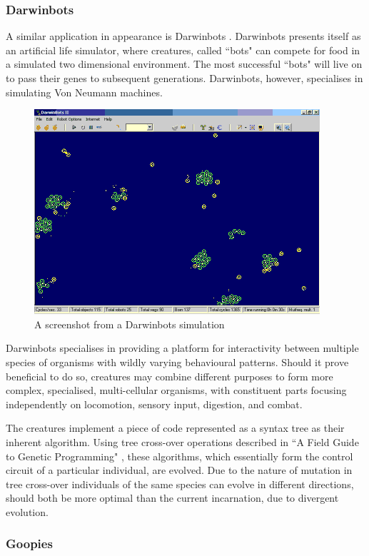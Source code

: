 \subsubsection{Darwinbots}

A similar application in appearance is Darwinbots \cite{darwinbots}. Darwinbots presents itself as an artificial life simulator, where creatures, called ``bots" can compete for food in a simulated two dimensional environment. The most successful ``bots" will live on to pass their genes to subsequent generations. Darwinbots, however, specialises in simulating Von Neumann machines.
\begin{figure}[!th]
	\centering
	\includegraphics[scale=1]{images/darwinbots}
	\caption{A screenshot from a Darwinbots simulation}
\end{figure}

Darwinbots specialises in providing a platform for interactivity between multiple species of organisms with wildly varying behavioural patterns. Should it prove beneficial to do so, creatures may combine different purposes to form more complex, specialised, multi-cellular organisms, with constituent parts focusing independently on locomotion, sensory input, digestion, and combat.

The creatures implement a piece of code represented as a syntax tree as their inherent algorithm. Using tree cross-over operations described in ``A Field Guide to Genetic Programming" \cite{fieldguide}, these algorithms, which essentially form the control circuit of a particular individual, are evolved. Due to the nature of mutation in tree cross-over individuals of the same species can evolve in different directions, should both be more optimal than the current incarnation, due to divergent evolution.

\subsubsection{Goopies}

